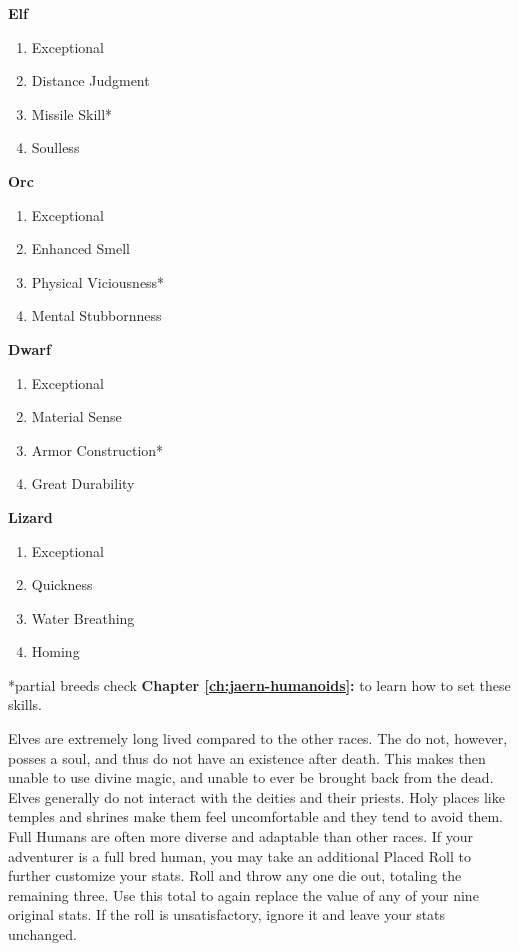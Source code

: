 \begin{multicols*}{2}
\begin{tcolorbox}[boxrule=0pt,title=\textbf{Racial Traits},left=5pt,right=5pt,top=5pt,bottom=5pt,boxsep=2pt,boxrule=0.6pt,lefttitle=2mm,toptitle=1mm,bottomtitle=1mm,colbacktitle=Navy,colback=white]
\setlength{\columnsep}{0cm}
\begin{multicols}{2}
\textbf{Elf}
\begin{enumerate}
\item Exceptional \PER
\item Distance Judgment
\item Missile Skill*
\item Soulless
\end{enumerate}
\textbf{Orc}
\begin{enumerate}
\item Exceptional \WIL
\item Enhanced Smell
\item Physical Viciousness*
\item Mental Stubbornness
\end{enumerate}
\textbf{Dwarf}
\begin{enumerate}
\item Exceptional \HEA
\item Material Sense
\item Armor Construction*
\item Great Durability
\end{enumerate}
\textbf{Lizard}
\begin{enumerate}
\item Exceptional \AGI
\item Quickness
\item Water Breathing
\item Homing
\end{enumerate}
\end{multicols}
*partial breeds check \textbf{Chapter \ref{ch:jaern-humanoids}: } to learn how to set these skills.
\end{tcolorbox}
\normalsize
Elves are extremely long lived compared to the other races. The do not, however, posses a soul, and thus do not have an existence after death. This makes then unable to use divine magic, and unable to ever be brought back from the dead. Elves generally do not interact with the deities and their priests. Holy places like temples and shrines make them feel uncomfortable and they tend to avoid them.\\
Full Humans are often more diverse and adaptable than other races. If your adventurer is a full bred human, you may take an additional Placed Roll to further customize your stats. Roll  and throw any one die out, totaling the remaining three. Use this total to again replace the value of any of your nine original stats. If the roll is unsatisfactory, ignore it and leave your stats unchanged.


\end{multicols*}
